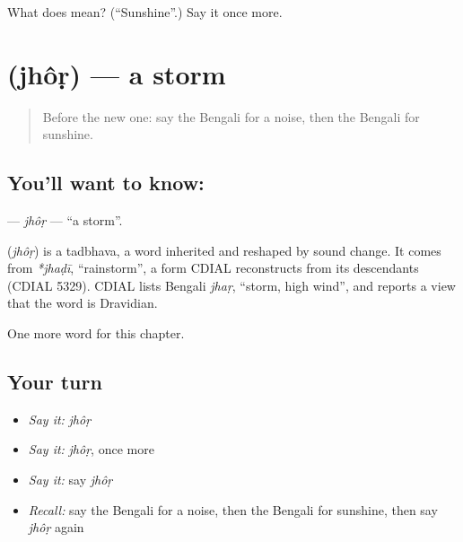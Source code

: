 \begin{tcolorbox}[breakable,colback=teal!4,colframe=teal!35!black,title={Before you move on}]
What does  mean? (\textquotedblleft{}Sunshine\textquotedblright{}.) Say it once more.
\end{tcolorbox}
\section[\texorpdfstring{\bn{ঝড়} (jhôṛ)}{ঝড় (jhôṛ)}]{ (jhôṛ) — a storm}

\label{lesson:BN-C255-jhor}



\begin{quote}
Before the new one: say the Bengali for a noise, then the Bengali for sunshine.
\end{quote}

\subsection*{You'll want to know: }
\textbf{} — \emph{jhôṛ} — \textquotedblleft{}a storm\textquotedblright{}.

\begin{cousinweb}
\textbf{} (\emph{jhôṛ}) is a tadbhava, a word inherited and reshaped by sound change. It comes from \emph{*jhaḍī}, \textquotedblleft{}rainstorm\textquotedblright{}, a form CDIAL reconstructs from its descendants (CDIAL 5329). CDIAL lists Bengali \emph{jhaṛ}, \textquotedblleft{}storm, high wind\textquotedblright{}, and reports a view that the word is Dravidian.
\end{cousinweb}

\begin{grammarlens}[title={What you've built}]
One more word for this chapter.
\end{grammarlens}

\subsection*{Your turn}
\begin{itemize}
\raggedright
  \item \emph{Say it:} \emph{jhôṛ}
  \item \emph{Say it:} \emph{jhôṛ}, once more
  \item \emph{Say it:} say \emph{jhôṛ}
  \item \emph{Recall:} say the Bengali for a noise, then the Bengali for sunshine, then say \emph{jhôṛ} again
\end{itemize}

